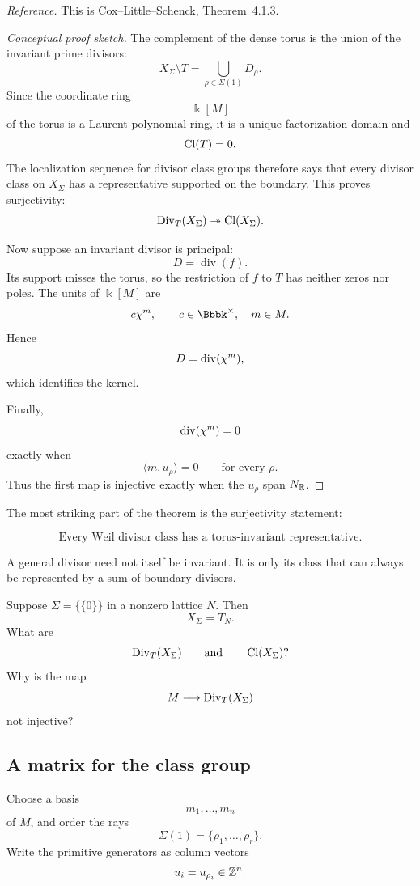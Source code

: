 \noindent
\textit{Reference.}
This is Cox--Little--Schenck, Theorem~4.1.3.

\begin{proof}[Conceptual proof sketch]
The complement of the dense torus is the union of the invariant prime
divisors:
\[
X_\Sigma\setminus T
=
\bigcup_{\rho\in\Sigma(1)}D_\rho.
\]
Since the coordinate ring
\[
\Bbbk[M]
\]
of the torus is a Laurent polynomial ring, it is a unique
factorization domain and
\[
\operatorname{Cl}(T)=0.
\]
The localization sequence for divisor class groups therefore says
that every divisor class on \(X_\Sigma\) has a representative
supported on the boundary. This proves surjectivity:
\[
\operatorname{Div}_T(X_\Sigma)
\twoheadrightarrow
\operatorname{Cl}(X_\Sigma).
\]

Now suppose an invariant divisor is principal:
\[
D=\operatorname{div}(f).
\]
Its support misses the torus, so the restriction of \(f\) to \(T\)
has neither zeros nor poles. The units of \(\Bbbk[M]\) are
\[
c\character{m},
\qquad
c\in\Bbbk^\times,\quad m\in M.
\]
Hence
\[
D=\operatorname{div}(\chi^{m}),
\]
which identifies the kernel.

Finally,
\[
\operatorname{div}(\chi^{m})=0
\]
exactly when
\[
\langle m,u_\rho\rangle=0
\qquad
\text{for every }\rho.
\]
Thus the first map is injective exactly when the \(u_\rho\) span
\(N_{\mathbb{R}}\).
\end{proof}

The most striking part of the theorem is the surjectivity statement:

\[
\boxed{
\text{Every Weil divisor class has a torus-invariant representative.}
}
\]

A general divisor need not itself be invariant. It is only its class
that can always be represented by a sum of boundary divisors.

\begin{pauseandthink}
Suppose \(\Sigma=\{\{0\}\}\) in a nonzero lattice \(N\). Then
\[
X_\Sigma=T_N.
\]
What are
\[
\operatorname{Div}_T(X_\Sigma)
\qquad\text{and}\qquad
\operatorname{Cl}(X_\Sigma)?
\]
Why is the map
\[
M\longrightarrow\operatorname{Div}_T(X_\Sigma)
\]
not injective?
\end{pauseandthink}

\subsection{A matrix for the class group}

Choose a basis
\[
m_1,\ldots,m_n
\]
of \(M\), and order the rays
\[
\Sigma(1)=\{\rho_1,\ldots,\rho_r\}.
\]
Write the primitive generators as column vectors
\[
u_i=u_{\rho_i}\in\mathbb{Z}^n.
\]

